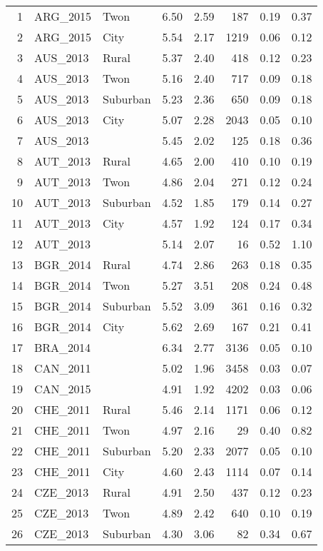 \documentclass[12pt, titlepage]{article}
\begin{document}
\begin{longtable}[H]{rllrrrrr}
		1 & ARG\_2015 & Twon & 6.50 & 2.59 & 187 & 0.19 & 0.37 \\ 
		2 & ARG\_2015 & City & 5.54 & 2.17 & 1219 & 0.06 & 0.12 \\ 
		3 & AUS\_2013 & Rural & 5.37 & 2.40 & 418 & 0.12 & 0.23 \\ 
		4 & AUS\_2013 & Twon & 5.16 & 2.40 & 717 & 0.09 & 0.18 \\ 
		5 & AUS\_2013 & Suburban & 5.23 & 2.36 & 650 & 0.09 & 0.18 \\ 
		6 & AUS\_2013 & City & 5.07 & 2.28 & 2043 & 0.05 & 0.10 \\ 
		7 & AUS\_2013 &  & 5.45 & 2.02 & 125 & 0.18 & 0.36 \\ 
		8 & AUT\_2013 & Rural & 4.65 & 2.00 & 410 & 0.10 & 0.19 \\ 
		9 & AUT\_2013 & Twon & 4.86 & 2.04 & 271 & 0.12 & 0.24 \\ 
		10 & AUT\_2013 & Suburban & 4.52 & 1.85 & 179 & 0.14 & 0.27 \\ 
		11 & AUT\_2013 & City & 4.57 & 1.92 & 124 & 0.17 & 0.34 \\ 
		12 & AUT\_2013 &  & 5.14 & 2.07 &  16 & 0.52 & 1.10 \\ 
		13 & BGR\_2014 & Rural & 4.74 & 2.86 & 263 & 0.18 & 0.35 \\ 
		14 & BGR\_2014 & Twon & 5.27 & 3.51 & 208 & 0.24 & 0.48 \\ 
		15 & BGR\_2014 & Suburban & 5.52 & 3.09 & 361 & 0.16 & 0.32 \\ 
		16 & BGR\_2014 & City & 5.62 & 2.69 & 167 & 0.21 & 0.41 \\ 
		17 & BRA\_2014 &  & 6.34 & 2.77 & 3136 & 0.05 & 0.10 \\ 
		18 & CAN\_2011 &  & 5.02 & 1.96 & 3458 & 0.03 & 0.07 \\ 
		19 & CAN\_2015 &  & 4.91 & 1.92 & 4202 & 0.03 & 0.06 \\ 
		20 & CHE\_2011 & Rural & 5.46 & 2.14 & 1171 & 0.06 & 0.12 \\ 
		21 & CHE\_2011 & Twon & 4.97 & 2.16 &  29 & 0.40 & 0.82 \\ 
		22 & CHE\_2011 & Suburban & 5.20 & 2.33 & 2077 & 0.05 & 0.10 \\ 
		23 & CHE\_2011 & City & 4.60 & 2.43 & 1114 & 0.07 & 0.14 \\ 
		24 & CZE\_2013 & Rural & 4.91 & 2.50 & 437 & 0.12 & 0.23 \\ 
		25 & CZE\_2013 & Twon & 4.89 & 2.42 & 640 & 0.10 & 0.19 \\ 
		26 & CZE\_2013 & Suburban & 4.30 & 3.06 &  82 & 0.34 & 0.67 \\ 

\end{longtable}
\end{document}

